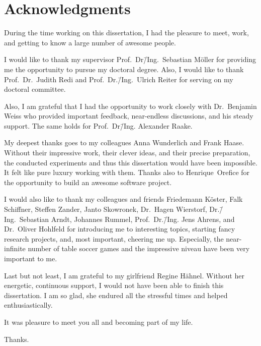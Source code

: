 
\bigskip

\begingroup
\let\clearpage\relax
\let\cleardoublepage\relax
\chapter*{Acknowledgments}
During the time working on this dissertation, I had the pleasure to meet, work, and getting to know a large number of awesome people.

I would like to thank my supervisor Prof.~Dr\=/Ing.~Sebastian Möller for providing me the opportunity to pursue my doctoral degree.
Also, I would like to thank Prof.~Dr.~Judith Redi and Prof.~Dr.\=/Ing.~Ulrich Reiter for serving on my doctoral committee.

Also, I am grateful that I had the opportunity to work closely with Dr.~Benjamin Weiss who provided important feedback, near-endless discussions, and his steady support.
The same holds for Prof.~Dr\=/Ing. Alexander Raake.

My deepest thanks goes to my colleagues Anna Wunderlich and Frank Haase.
Without their impressive work, their clever ideas, and their precise preparation, the conducted experiments and thus this dissertation would have been impossible.
It felt like pure luxury working with them.
Thanks also to Henrique~Orefice for the opportunity to build an awesome software project.

I would also like to thank my colleagues and friends Friedemann Köster, Falk Schiffner, Steffen Zander, Janto Skowronek, Dr.~Hagen Wierstorf, Dr.\=/Ing.~Sebastian Arndt, Johannes Rummel, Prof.~Dr.\=/Ing. Jens Ahrens, and Dr.~Oliver Hohlfeld for introducing me to interesting topics, starting fancy research projects, and, most important, cheering me up.
Especially, the near-infinite number of table soccer games and the impressive niveau have been very important to me.

Last but not least, I am grateful to my girlfriend Regine Hähnel.
Without her energetic, continuous support, I would not have been able to finish this dissertation.
I am so glad, she endured all the stressful times and helped enthusiastically.

\bigskip
It was pleasure to meet you all and becoming part of my life.

\bigskip
Thanks.

\endgroup
